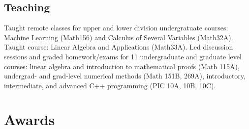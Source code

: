 \documentclass[11pt,a4paper,unicode]{moderncv}
\begin{document}
\subsection{Teaching}
{Taught remote classes for upper and lower division undergratuate courses: Machine Learning (Math156) and Calculus of Several Variables (Math32A).}
{Taught course: Linear Algebra and Applications (Math33A).}
{Led discussion sessions and graded homework/exams for 11 undergraduate and graduate level courses: linear algebra and introduction to mathematical proofs (Math 115A), undergrad- and grad-level numerical methods (Math 151B, 269A), introductory, intermediate, and advanced C++ programming (PIC 10A, 10B, 10C).}

\section{Awards}
\end{document}

